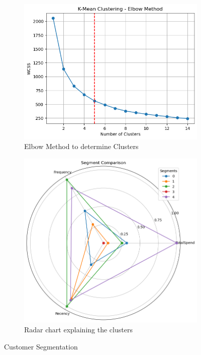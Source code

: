 \documentclass[11pt]{article} %
\begin{document}
\begin{figure}[H]
  \centering
  \begin{subfigure}[b]{0.4\textwidth}
    \includegraphics[width=\textwidth]{images/Customer_Clusters.png}
    \caption{Elbow Method to determine Clusters}
    \label{fig:K-Mean Cluster}
  \end{subfigure}
  \hfill
  \begin{subfigure}[b]{0.4\textwidth}
    \includegraphics[width=\textwidth]{images/Customer_Clusters_radar.png}
    \caption{Radar chart explaining the clusters}
    \label{fig:Radar Clusters}
  \end{subfigure}
  \caption{Customer Segmentation}
  \label{fig:Customer Segmentation}
\end{figure}
\end{document}
